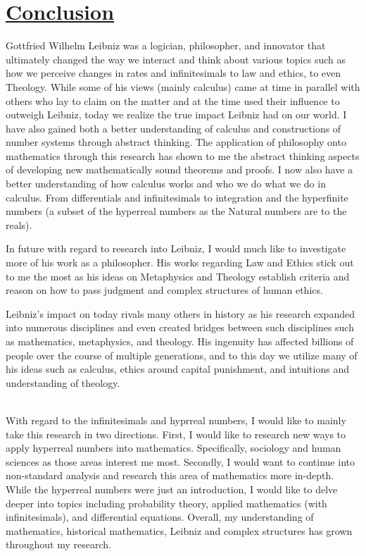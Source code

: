 \documentclass[12pt]{report}
\begin{document}
\chapter*{\underline{Conclusion}}
Gottfried Wilhelm Leibniz was a logician, philosopher, and innovator that ultimately changed the way we interact and think about various topics such as how we perceive changes in rates and infinitesimals to law and ethics, to even Theology.
While some of his views (mainly calculus) came at time in parallel with others who lay to claim on the matter and at the time used their influence to outweigh Leibniz, today we realize the true impact Leibniz had on our world.
I have also gained both a better understanding of calculus and constructions of number systems through abstract thinking.
The application of philosophy onto mathematics through this research has shown to me the abstract thinking aspects of developing new mathematically sound theorems and proofs.
I now also have a better understanding of how calculus works and who we do what we do in calculus.
From differentials and infinitesimals to integration and the hyperfinite numbers (a subset of the hyperreal numbers as the Natural numbers are to the reals).
\par


In future with regard to research into Leibniz, I would much like to investigate more of his work as a philosopher.
His works regarding Law and Ethics stick out to me the most as his ideas on Metaphysics and Theology establish criteria and reason on how to pass judgment and complex structures of human ethics. \par
Leibniz's impact on today rivals many others in history as his research expanded into numerous disciplines and even created bridges between such disciplines such as mathematics, metaphysics, and theology.
His ingenuity has affected billions of people over the course of multiple generations, and to this day we utilize many of his ideas such as calculus, ethics around capital punishment, and intuitions and understanding of theology.\par \\

With regard to the infinitesimals and hyprreal numbers, I would like to mainly take this research in two directions.
First, I would like to research new ways to apply hyperreal numbers into mathematics.
Specifically, sociology and human sciences as those areas interest me most.
Secondly, I would want to continue into non-standard analysis and research this area of mathematics more in-depth.
While the hyperreal numbers were just an introduction, I would like to delve deeper into topics including probability theory, applied mathematics (with infinitesimals), and differential equations.
Overall, my understanding of mathematics, historical mathematics, Leibniz and complex structures has grown throughout my research.
\newpage
    
\end{document}
